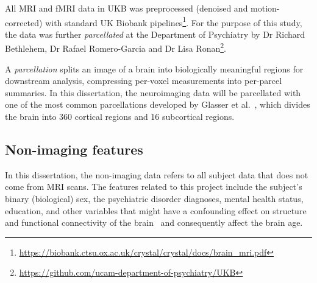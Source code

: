 All MRI and fMRI data in UKB was preprocessed (denoised and motion-corrected) with standard UK Biobank pipelines\footnote{\url{https://biobank.ctsu.ox.ac.uk/crystal/crystal/docs/brain_mri.pdf}}. For the purpose of this study, the data was further \textit{parcellated} at the Department of Psychiatry by Dr Richard Bethlehem, Dr Rafael Romero-Garcia and Dr Lisa Ronan\footnote{\url{https://github.com/ucam-department-of-psychiatry/UKB}}.

A \textit{parcellation} splits an image of a brain into biologically meaningful regions for downstream analysis, compressing per-voxel measurements into per-parcel summaries. In this dissertation, the neuroimaging data will be parcellated with one of the most common parcellations developed by Glasser et al.~\cite{glasser2016multi}, which divides the brain into 360 cortical regions and 16 subcortical regions. 



\subsection{Non-imaging features}

In this dissertation, the non-imaging data refers to all subject data that does not come from MRI scans. The features related to this project include the subject's binary (biological) sex, the psychiatric disorder diagnoses, mental health status, education, and other variables that might have a confounding effect on structure and functional connectivity of the brain~\cite{ruigrok2014meta} and consequently affect the brain age. 

